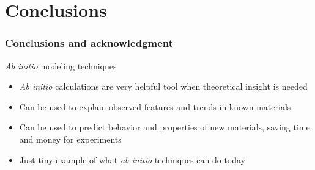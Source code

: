 \documentclass[noamsthm,8pt,t,xcolor={dvipsnames}]{beamer}
\begin{document}
\section{Conclusions}
\begin{frame}
   \frametitle{Conclusions and acknowledgment}
   \begin{block}{{\it Ab initio} modeling techniques}
      \begin{itemize}
         \item {\it Ab initio} calculations are very helpful tool when theoretical insight is needed 
         \item Can be used to explain observed features and trends in known materials
         \item Can be used to predict behavior and properties of new materials, saving time and money for experiments
         \item Just tiny example of what {\it ab initio} techniques can do today
      \end{itemize}
   \end{block}

\end{frame}
\end{document}
